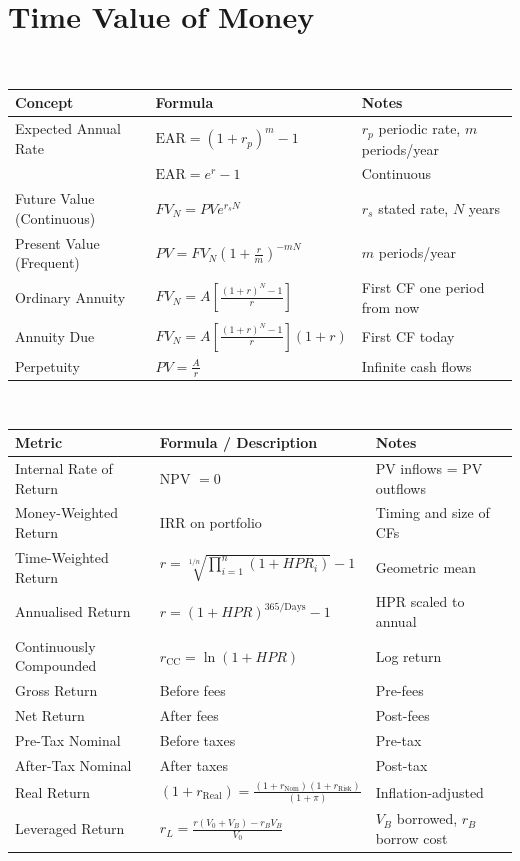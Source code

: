 \section{Time Value of Money}

\begin{definition} \\
\begin{tabular}{p{4.6cm}p{5.5cm}p{5cm}}
\hline
\textbf{Concept} & \textbf{Formula} & \textbf{Notes} \\
\hline
Expected Annual Rate & $\text{EAR} = (1 + r_p)^m - 1$ & $r_p$ periodic rate, $m$ periods/year \\
& $\text{EAR} = e^r - 1$ & Continuous \\
\hline
Future Value (Continuous) & $FV_N = PV e^{r_s N}$ & $r_s$ stated rate, $N$ years \\
\hline
Present Value (Frequent) & $PV = FV_N (1 + \frac{r}{m})^{-mN}$ & $m$ periods/year \\
\hline
Ordinary Annuity & $FV_N = A \left[ \frac{(1+r)^N - 1}{r} \right]$ & First CF one period from now \\
\hline
Annuity Due & $FV_N = A \left[ \frac{(1+r)^N - 1}{r} \right] (1+r)$ & First CF today \\
\hline
Perpetuity & $PV = \frac{A}{r}$ & Infinite cash flows \\
\hline
\end{tabular}
\end{definition}

\begin{definition} \\
\begin{tabular}{p{4.6cm}p{5.5cm}p{5cm}}
\hline
\textbf{Metric} & \textbf{Formula / Description} & \textbf{Notes} \\
\hline
Internal Rate of Return & NPV $= 0$ & PV inflows = PV outflows \\
\hline
Money-Weighted Return & IRR on portfolio & Timing and size of CFs \\
\hline
Time-Weighted Return & $r = \sqrt[1/n]{\prod\limits_{i=1}^n (1+HPR_i)} - 1$ & Geometric mean \\
\hline
Annualised Return & $r = (1+HPR)^{365/\text{Days}} - 1$ & HPR scaled to annual \\
\hline
Continuously Compounded & $r_{\text{CC}} = \ln(1+HPR)$ & Log return \\
\hline
Gross Return & Before fees & Pre-fees \\
\hline
Net Return & After fees & Post-fees \\
\hline
Pre-Tax Nominal & Before taxes & Pre-tax \\
\hline
After-Tax Nominal & After taxes & Post-tax \\
\hline
Real Return & $(1 + r_{\text{Real}}) = \frac{(1 + r_{\text{Nom}}) (1 + r_{\text{Risk}})}{(1 + \pi)}$ & Inflation-adjusted \\
\hline
Leveraged Return & $r_L = \frac{r(V_0 + V_B) - r_B V_B}{V_0}$ & $V_B$ borrowed, $r_B$ borrow cost \\
\hline
\end{tabular}
\end{definition}


